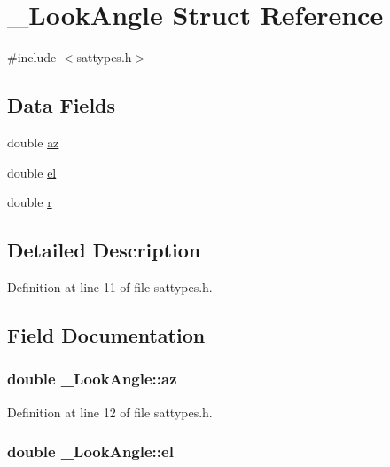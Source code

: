 \hypertarget{struct___look_angle}{\section{\-\_\-\-Look\-Angle Struct Reference}
\label{struct___look_angle}
}


{\ttfamily \#include $<$sattypes.\-h$>$}

\subsection*{Data Fields}
\begin{DoxyCompactItemize}
\item 
double \hyperlink{struct___look_angle_a23a394fd4e136e1eaae778814430c793}{az}
\item 
double \hyperlink{struct___look_angle_a3effd744d7e079ccb911ceb19ec7651b}{el}
\item 
double \hyperlink{struct___look_angle_a44993855b66fea009b0a4ee09b72c4c4}{r}
\end{DoxyCompactItemize}


\subsection{Detailed Description}


Definition at line 11 of file sattypes.\-h.



\subsection{Field Documentation}
\hypertarget{struct___look_angle_a23a394fd4e136e1eaae778814430c793}{
\subsubsection[{az}]{\setlength{\rightskip}{0pt plus 5cm}double \-\_\-\-Look\-Angle\-::az}}\label{struct___look_angle_a23a394fd4e136e1eaae778814430c793}


Definition at line 12 of file sattypes.\-h.

\hypertarget{struct___look_angle_a3effd744d7e079ccb911ceb19ec7651b}{
\subsubsection[{el}]{\setlength{\rightskip}{0pt plus 5cm}double \-\_\-\-Look\-Angle\-::el}}\label{struct___look_angle_a3effd744d7e079ccb911ceb19ec7651b}


